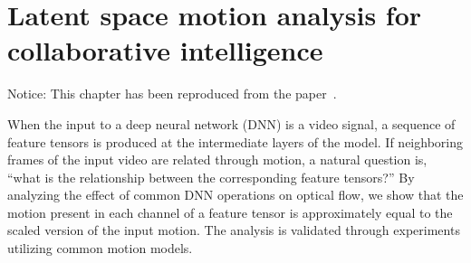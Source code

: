 \chapter{Latent space motion analysis for collaborative intelligence}

%
%
%




%




\begin{center}
  \small
  Notice: This chapter has been reproduced from the paper~\cite{ulhaq2021analysis}.
\end{center}




\begin{chapabstract}
When the input to a deep neural network (DNN) is a video signal, a sequence of feature tensors is produced at the intermediate layers of the model. If neighboring frames of the input video are related through motion, a natural question is, ``what is the relationship between the corresponding feature tensors?'' By analyzing the effect of common DNN operations on optical flow, we show that the motion present in each channel of a feature tensor is approximately equal to the scaled version of the input motion. The analysis is validated through experiments utilizing common motion models. %
\end{chapabstract}



